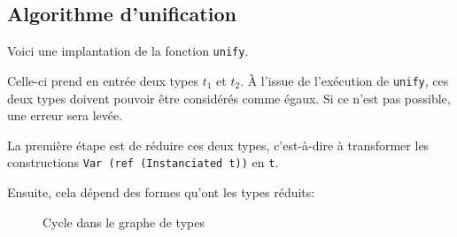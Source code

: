 \subsection*{Algorithme d'unification}

Voici une implantation de la fonction \texttt{unify}.

Celle-ci prend en entrée deux types $t_1$ et $t_2$. À l'issue de l'exécution de
\texttt{unify}, ces deux types doivent pouvoir être considérés comme égaux. Si
ce n'est pas possible, une erreur sera levée.

La première étape est de réduire ces deux types, c'est-à-dire à transformer les
constructions \texttt{Var (ref (Instanciated t))} en \texttt{t}.

Ensuite, cela dépend des formes qu'ont les types réduits:

\begin{figure}
  \centering
  \caption{Cycle dans le graphe de types}
\label{fig:typecycle}
\end{figure}

